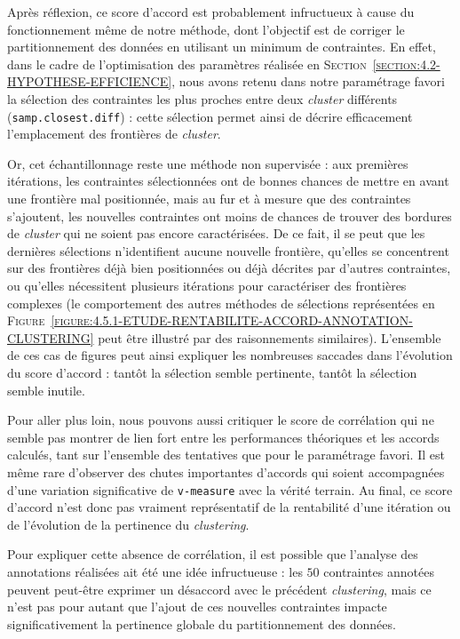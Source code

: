 			\begin{leftBarAuthorOpinion}
				Après réflexion, ce score d'accord est probablement infructueux à cause du fonctionnement même de notre méthode, dont l'objectif est de corriger le partitionnement des données en utilisant un minimum de contraintes.
				En effet, dans le cadre de l'optimisation des paramètres réalisée en \textsc{Section~\ref{section:4.2-HYPOTHESE-EFFICIENCE}}, nous avons retenu dans notre paramétrage favori la sélection des contraintes les plus proches entre deux \textit{cluster} différents (\texttt{samp.closest.diff}) : cette sélection permet ainsi de décrire efficacement l'emplacement des frontières de \textit{cluster}.
				
				Or, cet échantillonnage reste une méthode non supervisée : aux premières itérations, les contraintes sélectionnées ont de bonnes chances de mettre en avant une frontière mal positionnée, mais au fur et à mesure que des contraintes s'ajoutent, les nouvelles contraintes ont moins de chances de trouver des bordures de \textit{cluster} qui ne soient pas encore caractérisées.
				De ce fait, il se peut que les dernières sélections n'identifient aucune nouvelle frontière, qu'elles se concentrent sur des frontières déjà bien positionnées ou déjà décrites par d'autres contraintes, ou qu'elles nécessitent plusieurs itérations pour caractériser des frontières complexes (le comportement des autres méthodes de sélections représentées en \textsc{Figure~\ref{figure:4.5.1-ETUDE-RENTABILITE-ACCORD-ANNOTATION-CLUSTERING}} peut être illustré par des raisonnements similaires).
				L'ensemble de ces cas de figures peut ainsi expliquer les nombreuses saccades dans l'évolution du score d'accord : tantôt la sélection semble pertinente, tantôt la sélection semble inutile.
			\end{leftBarAuthorOpinion}
			
			Pour aller plus loin, nous pouvons aussi critiquer le score de corrélation qui ne semble pas montrer de lien fort entre les performances théoriques et les accords calculés, tant sur l'ensemble des tentatives que pour le paramétrage favori.
			Il est même rare d'observer des chutes importantes d'accords qui soient accompagnées d'une variation significative de \texttt{v-measure} avec la vérité terrain.
			Au final, ce score d'accord n'est donc pas vraiment représentatif de la rentabilité d'une itération ou de l'évolution de la pertinence du \textit{clustering}.
			\begin{leftBarAuthorOpinion}
				Pour expliquer cette absence de corrélation, il est possible que l'analyse des annotations réalisées ait été une idée infructueuse : les $50$ contraintes annotées peuvent peut-être exprimer un désaccord avec le précédent \textit{clustering}, mais ce n'est pas pour autant que l'ajout de ces nouvelles contraintes impacte significativement la pertinence globale du partitionnement des données.
			\end{leftBarAuthorOpinion}
			
